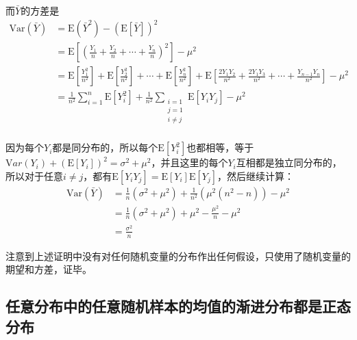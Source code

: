 \documentclass[UTF8]{ctexbook}
\begin{document}
而$\bar Y$的方差是
\begin{align*}
	\mathrm {Var}(\bar Y)&=\mathrm E(\bar Y^2)-(\mathrm E[\bar Y])^2\\
	&=\mathrm E[(\frac{Y_1}{n}+\frac{Y_2}{n}+\cdots+\frac{Y_n}{n})^2]-\mu^2\\
	&=\mathrm E[\frac{Y_1^2}{n^2}]+\mathrm E[\frac{Y_2^2}{n^2}]+\cdots+\mathrm E[\frac{Y_n^2}{n^2}]+\mathrm E[\frac{2Y_1Y_2}{n^2}+\frac{2Y_1Y_3}{n^2}+\cdots+\frac{Y_{n-1}Y_n}{n^2}]-\mu^2\\
	&=\frac{1}{n^2}\sum_{i=1}^n\mathrm E[Y_i^2]+\frac{1}{n^2}\sum_{\substack{i=1\\j=1\\i\neq j}}\mathrm E[Y_iY_j]-\mu^2\\
\end{align*}

因为每个$Y_i$都是同分布的，所以每个$\mathrm E[Y_i^2]$也都相等，等于$\mathrm Var(Y_i)+(\mathrm E[Y_i])^2=\sigma^2+\mu^2$，并且这里的每个$Y_i$互相都是独立同分布的，所以对于任意$i\neq j$，都有$\mathrm E[Y_iY_j]=\mathrm E[Y_i]\mathrm E[Y_j]$，然后继续计算：
\begin{align*}
	\mathrm {Var}(\bar Y)&=\frac{1}{n}(\sigma^2+\mu^2)+\frac{1}{n^2}(\mu^2(n^2-n))-\mu^2\\
	&=\frac{1}{n}(\sigma^2+\mu^2)+\mu^2-\frac{\mu^2}{n}-\mu^2\\
	&=\frac{\sigma^2}{n}
\end{align*}

注意到上述证明中没有对任何随机变量的分布作出任何假设，只使用了随机变量的期望和方差，证毕。

\subsection{任意分布中的任意随机样本的均值的渐进分布都是正态分布}
\label{any-dist-avg-aspt-normal}
\end{document}
